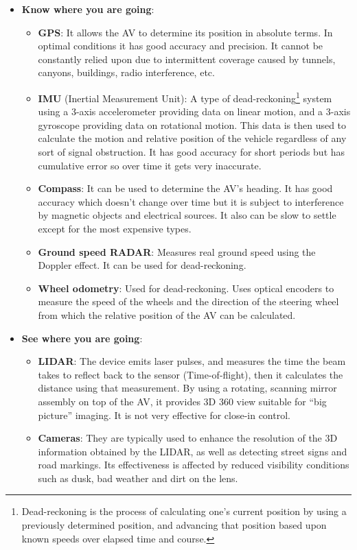 \documentclass[11pt]{article}
\begin{document}
\begin{itemize}
	\item \textbf{Know where you are going}:
		\begin{itemize}
			\item \textbf{GPS}: It allows the AV to determine its position in absolute terms. In optimal conditions it has good accuracy and precision. It cannot be constantly relied upon due to intermittent coverage caused by tunnels, canyons, buildings, radio interference, etc. \cite{SchweberMouser}
			\item \textbf{IMU} (Inertial Measurement Unit): A type of dead-reckoning\footnote{Dead-reckoning is the process of calculating one's current position by using a previously determined position, and advancing that position based upon known speeds over elapsed time and course.} system using a 3-axis accelerometer providing data on linear motion, and a 3-axis gyroscope providing data on rotational motion. This data is then used to calculate the motion and relative position of the vehicle regardless of any sort of signal obstruction. It has good accuracy for short periods but has cumulative error so over time it gets very inaccurate.
			\item \textbf{Compass}: It can be used to determine the AV's heading. It has good accuracy which doesn't change over time but it is subject to interference by magnetic objects and electrical sources. It also can be slow to settle except for the most expensive types.
			\item \textbf{Ground speed RADAR}: Measures real ground speed using the Doppler effect. It can be used for dead-reckoning.
			\item \textbf{Wheel odometry}: Used for dead-reckoning. Uses optical encoders to measure the speed of the wheels and the direction of the steering wheel from which the relative position of the AV can be calculated.
		\end{itemize}
	\item \textbf{See where you are going}:
		\begin{itemize}
			\item \textbf{LIDAR}: The device emits laser pulses, and measures the time the beam takes to reflect back to the sensor (Time-of-flight), then it calculates the distance using that measurement. By using a rotating, scanning mirror assembly on top of the AV, it provides 3D 360{\textdegree} view suitable for ``big picture'' imaging. It is not very effective for close-in control.
			\item \textbf{Cameras}: They are typically used to enhance the resolution of the 3D information obtained by the LIDAR, as well as detecting street signs and road markings. Its effectiveness is affected by reduced visibility conditions such as dusk, bad weather and dirt on the lens.

\end{itemize}
\end{itemize}
\end{document}
